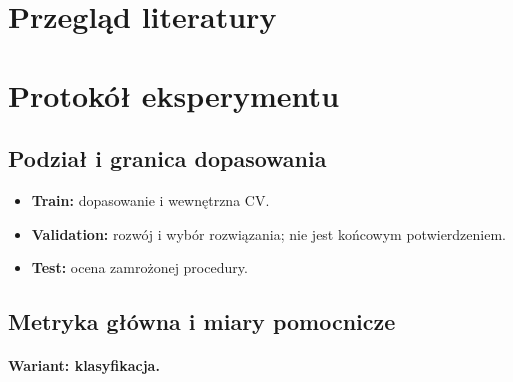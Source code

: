 \documentclass[10pt,twocolumn,a4paper]{article}
\newif\ifwskazowki
\newcommand{\wskazowka}[1]{\ifwskazowki
  \par\begingroup\small\color{black!72}\raggedright#1\par\endgroup\fi}
\begin{document}
\section{Przegląd literatury}
\wskazowka{Omów prace dotyczące problemu, danych i adekwatnych metod.
Wskaż zadanie, dane, protokół, wynik i związek z własnym projektem.
Liczby z innych populacji i podziałów nie są bezpośrednio porównywalne.
Dokumentacja biblioteki nie zastępuje badań z publikacji. Najlepiej publikacje operujące na tym samym zbiorze, ale jeśli nie ma to cos podobnego}

\section{Protokół eksperymentu}
\subsection{Podział i granica dopasowania}
\wskazowka{Uzasadnij podział losowy, stratyfikowany, grupowy lub
czasowy względem przyszłego użycia. Podaj liczebności, proporcje,
ziarna i sposób utrwalenia indeksów. Opisz kontrolę powtórzeń
i przenikania informacji. Wiele wierszy nie oznacza automatycznie
wielu niezależnych obiektów. Mocno uzasadnij dlaczego podział jest poprawny i co zostało wzięte pod uwagę}

\begin{itemize}
\item \textbf{Train:} dopasowanie i wewnętrzna CV.
\item \textbf{Validation:} rozwój i wybór rozwiązania; nie jest końcowym potwierdzeniem.
\item \textbf{Test:} ocena zamrożonej procedury.
\end{itemize}

\wskazowka{
Preprocessing, selekcja i uczone transformacje muszą być dopasowane
na właściwej części treningowej, także w CV. Proporcje z wykładów
są przykładem, a nie uniwersalną regułą - można sobie dobierać parametry zgodnie z własną intuicją}

\subsection{Metryka główna i miary pomocnicze}
\wskazowka{Wybór miar i uzasadnienie }

\paragraph{Wariant: klasyfikacja.}
\wskazowka{Określ klasę pozytywną i znaczenie FP/FN. Uzasadnij
miarę decyzji (np. F$_\beta$, recall przy ograniczeniu precision,
balanced accuracy), rankingu (AP, ROC AUC) lub prawdopodobieństw
(log loss, Brier). Samo accuracy może ukrywać ignorowanie
rzadkiej klasy. W zadaniu wieloklasowym podaj wyniki klas i sposób uśredniania.}
\end{document}
